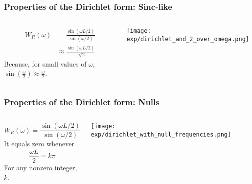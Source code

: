 \documentclass{beamer}
\begin{document}
\begin{frame}
  \frametitle{Properties of the Dirichlet form: Sinc-like}

  \begin{columns}
    \begin{column}{0.5\textwidth}

      \begin{align*}      
        W_R(\omega) &= \frac{\sin(\omega L/2)}{\sin(\omega/2)}\\
        &\approx \frac{\sin(\omega L/2)}{\omega/2}
      \end{align*}
      Because, for small values of $\omega$,
      $\sin\left(\frac{\omega}{2}\right)\approx\frac{\omega}{2}$.

    \end{column}
    \begin{column}{0.5\textwidth}
      \centerline{\texttt{[image: exp/dirichlet\_and\_2\_over\_omega.png]}}
    \end{column}
  \end{columns}
\end{frame}

\begin{frame}
  \frametitle{Properties of the Dirichlet form: Nulls}

  \begin{columns}
    \begin{column}{0.5\textwidth}

      \begin{displaymath}      
        W_R(\omega) = \frac{\sin(\omega L/2)}{\sin(\omega/2)}
      \end{displaymath}
      It equals zero whenever 
      \begin{displaymath}
        \frac{\omega L}{2} = k\pi
      \end{displaymath}
      For any nonzero integer, $k$.
    \end{column}
    \begin{column}{0.5\textwidth}
      \centerline{\texttt{[image: exp/dirichlet\_with\_null\_frequencies.png]}}
    \end{column}
  \end{columns}
\end{frame}
\end{document}
